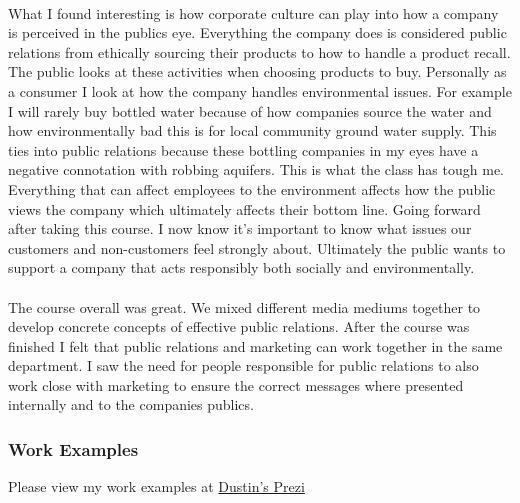 \documentclass[12pt,titlepage]{article}
\begin{document}
\paragraph {}
What I found interesting is how corporate culture can play into how a company is perceived in the publics eye. Everything the company does is considered public relations from ethically sourcing their products to how to handle a product recall. The public looks at these activities when choosing products to buy. Personally as a consumer I look at how the company handles environmental issues. For example I will rarely buy bottled water because of how companies source the water and how environmentally bad this is for local community ground water supply. This ties into public relations because these bottling companies in my eyes have a negative connotation with robbing aquifers. This is what the class has tough me. Everything that can affect employees to the environment affects how the public views the company which ultimately affects their bottom line.
Going forward after taking this course. I now know it's important to know what issues our customers and non-customers feel strongly about. Ultimately the public wants to support a company that acts responsibly both socially and environmentally.
\paragraph {}
The course overall was great. We mixed different media mediums together to develop concrete concepts of effective public relations. After the course was finished I felt that public relations and marketing can work together in the same department. I saw the need for people responsible for public relations to also work close with marketing to ensure the correct messages where presented internally and to the companies publics.



\subsubsection{Work Examples}


Please view my work examples at \href{http://www.bit.ly/2eS3K2u}{Dustin's Prezi}
\end{document}
